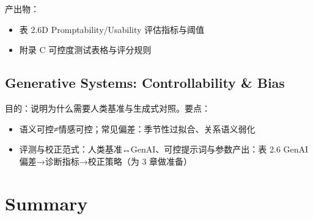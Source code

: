 产出物：

\begin{itemize}

  \item 表 2.6D Promptability/Usability 评估指标与阈值

  \item 附录 C 可控度测试表格与评分规则

\end{itemize}

\subsection{Generative Systems: Controllability \& Bias}

目的：说明为什么需要人类基准与生成式对照。要点：

\begin{itemize}

  \item 语义可控≠情感可控；常见偏差：季节性过拟合、关系语义弱化

  \item 评测与校正范式：人类基准↔GenAI、可控提示词与参数产出：表 2.6 GenAI 偏差→诊断指标→校正策略（为 3 章做准备）

\end{itemize}

\section{Summary}
